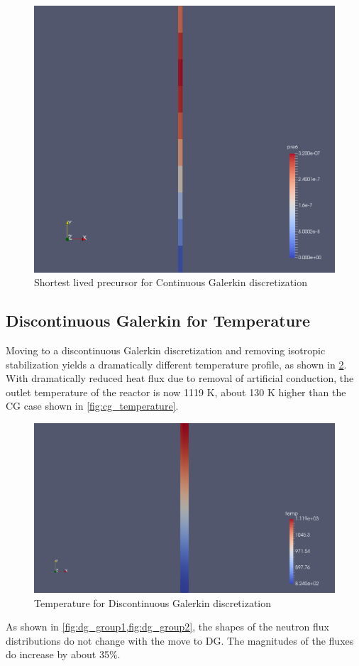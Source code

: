 \documentclass{article}
\let\Oldsubsection\subsection
\renewcommand{\subsection}{\FloatBarrier\Oldsubsection}
\begin{document}
\begin{figure}[htpb]
  \centering
  \includegraphics[width=.5\textwidth]{shortest_lived_precursor.png}
  \caption{Shortest lived precursor for Continuous Galerkin discretization}
  \label{fig:cg_shortest_precursor}
\end{figure}

\FloatBarrier

\subsection{Discontinuous Galerkin for Temperature}

Moving to a discontinuous Galerkin discretization and removing isotropic
stabilization yields a dramatically different temperature profile, as shown in
\cref{fig:dg_temperature}. With dramatically reduced heat flux due to removal of
artificial conduction, the outlet temperature of the reactor is now 1119 K,
about 130 K higher than the \gls{CG} case shown in \cref{fig:cg_temperature}.

\begin{figure}[htpb]
  \centering
  \includegraphics[width=.5\textwidth]{dg_temperature.png}
  \caption{Temperature for Discontinuous Galerkin discretization}
  \label{fig:dg_temperature}
\end{figure}

As shown in \cref{fig:dg_group1,fig:dg_group2}, the shapes of the neutron flux
distributions do not change with the move to \gls{DG}. The magnitudes of the
fluxes do increase by about 35\%.
\end{document}
